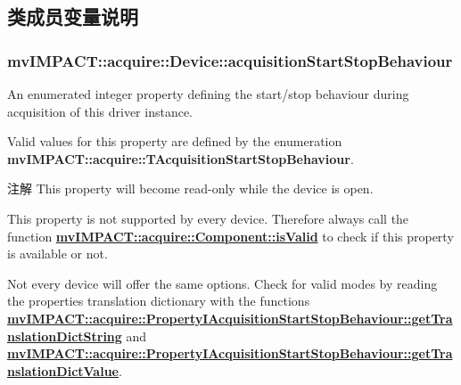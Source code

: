 \subsection{类成员变量说明}
\hypertarget{classmv_i_m_p_a_c_t_1_1acquire_1_1_device_aa5cdb4615de973bbf1c24f2fd5a3d1b5}{
\subsubsection[{acquisition\+Start\+Stop\+Behaviour}]{ mv\+I\+M\+P\+A\+C\+T\+::acquire\+::\+Device\+::acquisition\+Start\+Stop\+Behaviour}}\label{classmv_i_m_p_a_c_t_1_1acquire_1_1_device_aa5cdb4615de973bbf1c24f2fd5a3d1b5}


An enumerated integer property defining the start/stop behaviour during acquisition of this driver instance. 

Valid values for this property are defined by the enumeration {\bfseries mv\+I\+M\+P\+A\+C\+T\+::acquire\+::\+T\+Acquisition\+Start\+Stop\+Behaviour}.

\begin{DoxyNote}{注解}
This property will become read-\/only while the device is open.

This property is not supported by every device. Therefore always call the function {\bfseries \hyperlink{classmv_i_m_p_a_c_t_1_1acquire_1_1_component_ac51e55e7e046101f3c6119d84123abd5}{mv\+I\+M\+P\+A\+C\+T\+::acquire\+::\+Component\+::is\+Valid}} to check if this property is available or not.
\end{DoxyNote}
Not every device will offer the same options. Check for valid modes by reading the properties translation dictionary with the functions {\bfseries \hyperlink{classmv_i_m_p_a_c_t_1_1acquire_1_1_enum_property_i_af5ec5a9c3657af2917f4ead78ef067db}{mv\+I\+M\+P\+A\+C\+T\+::acquire\+::\+Property\+I\+Acquisition\+Start\+Stop\+Behaviour\+::get\+Translation\+Dict\+String}} and {\bfseries \hyperlink{classmv_i_m_p_a_c_t_1_1acquire_1_1_enum_property_i_a0c50700ebff2806621c63d03b624f200}{mv\+I\+M\+P\+A\+C\+T\+::acquire\+::\+Property\+I\+Acquisition\+Start\+Stop\+Behaviour\+::get\+Translation\+Dict\+Value}}.

